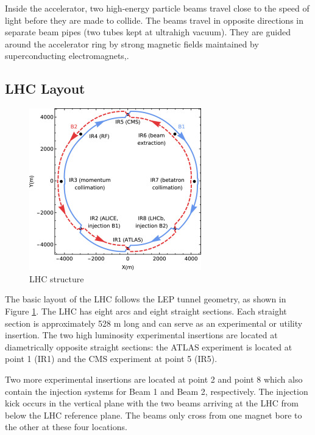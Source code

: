 \documentclass[a4paper, oneside, 11pt, openright]{book}
\begin{document}
			Inside the accelerator, two high-energy particle beams travel close to the speed of light before they are made to collide. The beams travel in opposite directions in separate beam pipes (two tubes kept at ultrahigh vacuum). They are guided around the accelerator ring by strong magnetic fields maintained by superconducting electromagnets\cite{LHC introduction},\cite{LHC site}.
				\subsection{LHC Layout}
					\begin{figure}[H]
						\centering
						\includegraphics[width=0.3\textheight]{tesi_images/LHC_structure.jpg}
						\caption{LHC structure}
						\label{fig:LHC structure}
					\end{figure}
					The basic layout of the LHC follows the LEP tunnel geometry, as shown in Figure \ref{fig:LHC structure}. The LHC has eight arcs and eight straight sections. Each straight section is approximately 528 m long and can serve as an experimental or utility insertion. The two high luminosity experimental insertions are located at diametrically opposite straight sections: the ATLAS experiment is located at point 1 (IR1) and the CMS experiment at point 5 (IR5).
					
					Two more experimental insertions are located at point 2 and point 8 which also contain the injection systems for Beam
					1 and Beam 2, respectively. The injection kick occurs in the vertical plane with the two beams arriving at the LHC from below the LHC reference plane. The beams only cross from one magnet bore to the other at
					these four locations.
					
\end{document}
